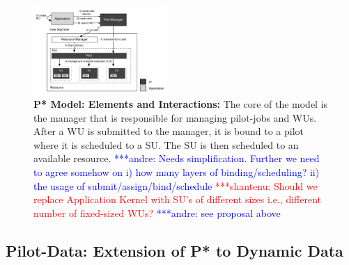 \documentclass[conference,final]{IEEEtran}
\newcommand{\jhanote}[1]{ {\textcolor{red} { ***shantenu: #1 }}}
\newcommand{\alnote}[1]{ {\textcolor{blue} { ***andre: #1 }}}
\newcommand{\alnote}[1]{}
\newcommand{\jhanote}[1]{}
\newcommand{\up}{\vspace*{-1em}}
\newcommand{\upp}{\vspace*{-0.5em}}
\begin{document}
\begin{figure}[htbp]
    \centering\up
    \includegraphics[width=0.45\textwidth]{figures/pstar_model_single.pdf}
    \caption{ \textbf{P* Model: Elements and Interactions:} The core
      of the model is the manager that is responsible for managing
      pilot-jobs and WUs. After a WU is submitted to the manager, it
      is bound to a pilot where it is scheduled to a SU. The SU is
      then scheduled to an available resource. \alnote{Needs
        simplification. Further we need to agree somehow on i) how
        many layers of binding/scheduling? ii) the usage of
        submit/assign/bind/schedule} \jhanote{Should we replace
        Application Kernel with SU's of different sizes i.e.,
        different number of fixed-sized WUs?} \alnote{see proposal 
		above}\upp\upp}
    \label{fig:figures_pstar}
\end{figure}


\subsection{Pilot-Data: Extension of P* to Dynamic Data\upp\upp}
\label{sec:pilot-data}





\end{document}
